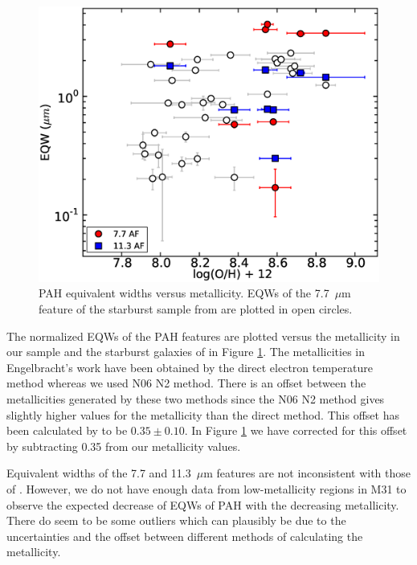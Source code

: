 \begin{figure}
\centering
\includegraphics[scale=0.27]{./oxyvseqw.eps}
\caption{ PAH equivalent widths versus metallicity. EQWs of the 7.7~$\mu$m feature of the starburst sample from \citet{Engelbracht_2008} are plotted in open circles.}
\label{metalicityVseqw}
\end{figure}

The normalized EQWs of the PAH features are plotted versus the metallicity in our sample and the starburst galaxies of \citet{Engelbracht_2008}
 in Figure \ref{metalicityVseqw}. The metallicities in Engelbracht's work have been obtained by the direct electron temperature method 
 \citep{Skillman1998} whereas we used N06 N2 method. There is an offset between the metallicities generated by these two methods 
 since the N06 N2 method gives slightly higher values for the metallicity than the direct method. 
 This offset has been calculated by \citet{Mitchel2014} to be $0.35\pm0.10$. In Figure \ref{metalicityVseqw} we have corrected for this offset 
 by subtracting 0.35 from our metallicity values. 
	
Equivalent widths of the 7.7 and 11.3~$\mu$m features are not inconsistent with those of \citet{Engelbracht_2008}. However, we do not have enough data from low-metallicity regions in M31 to observe the expected decrease of EQWs of PAH with the decreasing metallicity.  There do seem to be some outliers which 
can plausibly be due to the uncertainties  and the offset between different methods of calculating the metallicity.  



